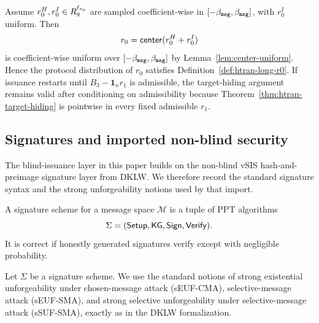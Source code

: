 \begin{corollary}\label{cor:htran-protocol-r0}
Assume $r_0^H,r_0^I\in R_q^{\ell_{r_0}}$ are sampled coefficient-wise in $[-\beta_{\mathtt{msg}},\beta_{\mathtt{msg}}]$, with
$r_0^I$ uniform.  Then
\[
  r_0=\mathsf{center}(r_0^H+r_0^I)
\]
is coefficient-wise uniform over $[-\beta_{\mathtt{msg}},\beta_{\mathtt{msg}}]$ by Lemma~\ref{lem:center-uniform}.  Hence the
protocol distribution of $r_0$ satisfies Definition~\ref{def:htran-long-r0}.  If issuance restarts until
$B_3-\mathbf 1_n r_1$ is admissible, the target-hiding argument remains valid after conditioning on
admissibility because Theorem~\ref{thm:htran-target-hiding} is pointwise in every fixed admissible $r_1$.
\end{corollary}

\subsection{Signatures and imported non-blind security}
\label{subsec:prelim-signatures}
The blind-issuance layer in this paper builds on the non-blind vSIS hash-and-preimage signature layer from
DKLW.  We therefore record the standard signature syntax and the strong unforgeability notions used by that
import.

\begin{definition}\label{def:signature-scheme}
A signature scheme for a message space $\mathcal M$ is a tuple of PPT algorithms
\[
  \Sigma=(\mathsf{Setup},\mathsf{KG},\mathsf{Sign},\mathsf{Verify}).
\]
It is correct if honestly generated signatures verify except with negligible probability.
\end{definition}

\begin{definition}\label{def:seuf-defs}
Let $\Sigma$ be a signature scheme.  We use the standard notions of strong existential unforgeability under
chosen-message attack (sEUF-CMA), selective-message attack (sEUF-SMA), and strong selective unforgeability
under selective-message attack (sSUF-SMA), exactly as in the DKLW formalization.
\end{definition}

